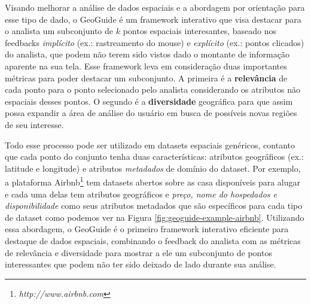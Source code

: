 Visando melhorar a análise de dados espaciais e a abordagem por orientação para esse tipo de dado, o GeoGuide \cite{omidvarTehrani2017} é um framework interativo que visa destacar para o analista um subconjunto de $k$ pontos espaciais interesantes, baseado nos feedbacks \textit{implícito} (ex.: rastreamento do mouse) e \textit{explícito} (ex.: pontos clicados) do analista, que podem não terem sido vistos dado o montante de informação aparente na sua tela. Esse framework leva em consideração duas importantes métricas para poder destacar um subconjunto. A primeira é a \textbf{relevância} de cada ponto para o ponto selecionado pelo analista considerando os atributos não espaciais desses pontos. O segundo é a \textbf{diversidade} geográfica para que assim possa expandir a área de análise do usuário em busca de possíveis novas regiões de seu interesse.


Todo esse processo pode ser utilizado em datasets espaciais genéricos, contanto que cada ponto do conjunto tenha duas características: atributos geográficos (ex.: latitude e longitude) e atributos \textit{metadados} de domínio do dataset. Por exemplo, a plataforma Airbnb\footnote{\it http://www.airbnb.com} tem datasets abertos sobre as casa disponíveis para alugar e cada uma delas tem atributos geográficos e \textit{preço, nome do hospedados e disponibilidade} como seus atributos metadados que são específicos para cada tipo de dataset como podemos ver na Figura \ref{fig:geoguide-example-airbnb}. Utilizando essa abordagem, o GeoGuide é o primeiro framework interativo eficiente para destaque de dados espaciais, combinando o feedback do analista com as métricas de relevância e diversidade para mostrar a ele um subconjunto de pontos interessantes que podem não ter sido deixado de lado durante sua análise.

